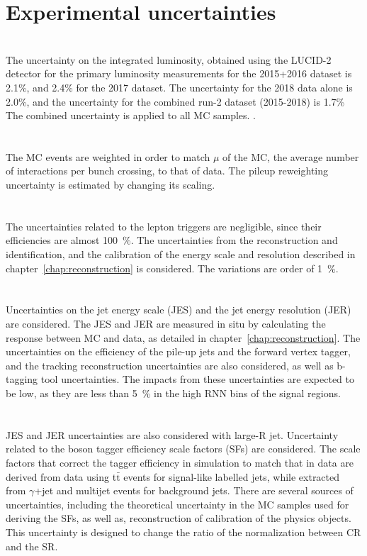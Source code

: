 \section{Experimental uncertainties}
\label{sec:ExperimUnc}
\noindent\textbf{}\\
The uncertainty on the integrated luminosity, obtained using the LUCID-2 detector for the primary luminosity measurements for the 2015+2016 dataset is 2.1\%, and 2.4\% for the 2017 dataset. The uncertainty for the 2018 data alone is 2.0\%, and the uncertainty for the combined run-2 dataset (2015-2018) is 1.7\% The combined uncertainty is applied to all MC samples. \cite{AtlasLumiRun2}. \\ 
\\
\noindent\textbf{}\\
The MC events are weighted in order to match $\mu$ of the MC, the average number of interactions per bunch crossing, to that of data. 
The pileup reweighting uncertainty is estimated by changing its scaling. \\
\\
\noindent\textbf{}\\
The uncertainties related to the lepton triggers are negligible, since their efficiencies are almost 100~\%.
The uncertainties from the reconstruction and identification, and the calibration of the energy scale and resolution described in chapter~\ref{chap:reconstruction} is considered. The variations are order of 1~\%. \\
\\
\noindent\textbf{}\\
Uncertainties on the jet energy scale (JES)  and the jet energy resolution (JER) are considered.
The JES and JER are measured in situ by calculating the response between MC and data, as detailed in chapter~\ref{chap:reconstruction}. 
The uncertainties on the efficiency of the pile-up jets and the forward vertex tagger, and the tracking reconstruction uncertainties are also considered, as well as b-tagging tool uncertainties.
The impacts from these uncertainties are expected to be low, as they are less than 5~\% in the high RNN bins of the signal regions. 
\\
\\
\noindent\textbf{}\\
JES and JER uncertainties are also considered with large-R jet.  
Uncertainty related to the boson tagger efficiency scale factors (SFs) \cite{ATL-PHYS-PUB-2015-053} are considered. 
The scale factors that correct the tagger efficiency in simulation to match that in data are derived from data using t$\bar{\mathrm{t}}$ events for signal-like labelled jets, while extracted from $\gamma$+jet and multijet events for background jets.
There are several sources of uncertainties, including the theoretical uncertainty in the MC samples used for deriving the SFs, as well as, reconstruction of calibration of the physics objects. 
This uncertainty is designed to change the ratio of the normalization between CR and the SR.

